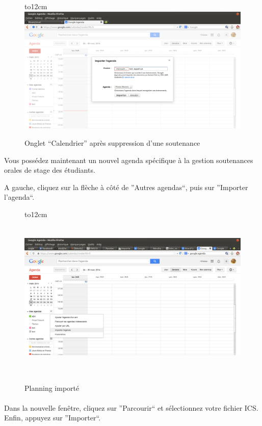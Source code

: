 \documentclass[a4paper,10pt]{report}
\begin{document}
	  \begin{figure}[H]
	   \hbox to12cm{\hss\includegraphics[width=18cm]{../general/parcourir.png}\hss}
	   \caption{Onglet ``Calendrier'' après suppression d'une soutenance}
	 \end{figure}
	  
	  
	  Vous possédez maintenant un nouvel agenda spécifique à la gestion soutenances orales de stage des étudiants.
	  
	  A gauche, cliquez sur la flèche à côté de ''Autres agendas``, puis sur ''Importer l'agenda``.
	  
	   \begin{figure}[H]
	   \hbox to12cm{\hss\includegraphics[height=8cm,width=18cm]{../general/import_agenda.png}\hss}
	   \caption{Planning importé}
	 \end{figure}
	  
	\paragraph{}
	  Dans la nouvelle fenêtre, cliquez sur ''Parcourir`` et sélectionnez votre fichier ICS.
	  Enfin, appuyez sur ''Importer``.
	  
\end{document}
